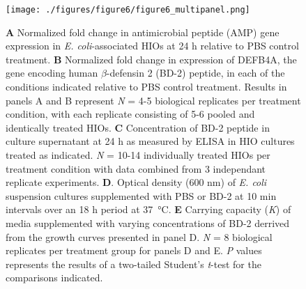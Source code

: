 \documentclass[9pt,lineo]{elife}
\begin{document}
\begin{figure}
\begin{fullwidth}
\centering
\texttt{[image: ./figures/figure6/figure6\_multipanel.png]}
\caption{\textbf{A} Normalized fold change in antimicrobial peptide (AMP) gene expression in \textit{E. coli}-associated HIOs at 24 h relative to PBS control treatment. \textbf{B} Normalized fold change in expression of DEFB4A, the gene encoding human $\beta$-defensin 2 (BD-2) peptide, in each of the conditions indicated relative to PBS control treatment. Results in panels A and B represent \textit{N} = 4-5 biological replicates per treatment condition, with each replicate consisting of 5-6 pooled and identically treated HIOs. \textbf{C} Concentration of BD-2 peptide in culture supernatant at 24 h as measured by ELISA in HIO cultures treated as indicated. \textit{N} = 10-14 individually treated HIOs per treatment condition with data combined from 3 independant replicate experiments. \textbf{D}. Optical density (600 nm) of \textit{E. coli} suspension cultures supplemented with PBS or BD-2 at 10 min intervals over an 18 h period at \SI{37}{\celsius}. \textbf{E} Carrying capacity (\textit{K}) of media supplemented with varying concentrations of BD-2 derrived from the growth curves presented in panel D. \textit{N} = 8 biological replicates per treatment group for panels D and E. \textit{P} values represents the results of a two-tailed Student's \textit{t}-test for the comparisons indicated.}
\label{fig:fullwidth}
\end{fullwidth}
\end{figure}
\end{document}

